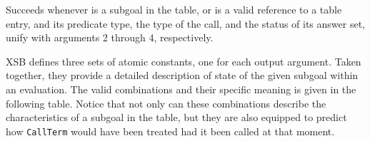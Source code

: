 \begin{description}


%
Succeeds whenever  is a subgoal in the table, or
 is a valid reference to a table entry, and its
predicate type, the type of the call, and the status of its answer
set, unify with arguments 2 through 4, respectively.

XSB defines three sets of atomic constants, one for each output
argument.  Taken together, they provide a detailed description of
state of the given subgoal within an evaluation.  The valid
combinations and their specific meaning is given in the following
table.  Notice that not only can these combinations describe the
characteristics of a subgoal in the table, but they are also equipped
to predict how {\tt CallTerm} would have been treated had it been
called at that moment.


\end{description}
